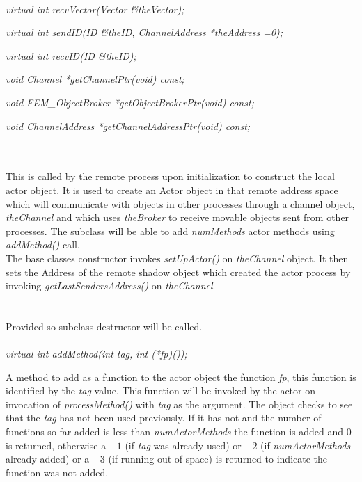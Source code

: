 \\
{\em virtual int recvVector(Vector \&theVector);} 

{\em virtual int sendID(ID \&theID, ChannelAddress *theAddress =0);}

{\em virtual int recvID(ID \&theID);} 

{\em void Channel *getChannelPtr(void) const;}

{\em void FEM\_ObjectBroker *getObjectBrokerPtr(void) const;}

{\em void ChannelAddress *getChannelAddressPtr(void) const;}



  \\
  \\ 
This is called by the remote process upon initialization to construct
the local actor object. It is used to create an Actor object in that
remote address space which will communicate with objects in other
processes through a channel object, {\em theChannel} and which uses
{\em theBroker} to receive movable objects sent from other
processes. The subclass will be able to add {\em numMethods} actor
methods using {\em addMethod()} call. \\   

The base classes constructor invokes {\em setUpActor()} on {\em
theChannel} object. It then sets the Address of the remote shadow
object which created the actor process by invoking {\em
getLastSendersAddress()} on {\em theChannel}. \\


 \\
\\ 
Provided so subclass destructor will be called. \\

  \\
{\em virtual int addMethod(int tag, int (*fp)());}

A method to add as a function to the actor object the function {\em
fp}, this function is identified by the {\em tag} value. This
function will be invoked by the actor on invocation of {\em 
processMethod()} with {\em tag} as the argument. The object checks to
see that the {\em tag} has not been used previously. If it has not and
the number of functions so far added is less than {\em numActorMethods}
the function is added and $0$ is returned, otherwise a $-1$ (if {\em
tag} was already used) or $-2$ (if {\em numActorMethods} already
added) or a $-3$ (if running out of space) is returned to indicate the
function was not added. \\  

